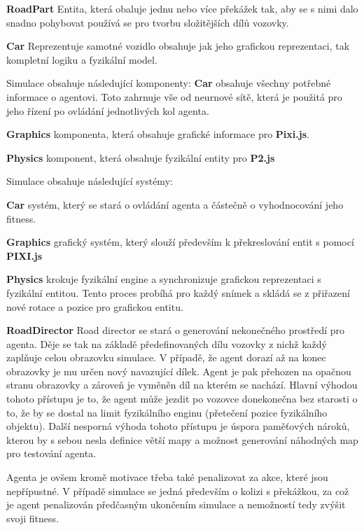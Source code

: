 \textbf{RoadPart} Entita, která obaluje jednu nebo více překážek tak, aby se s nimi dalo snadno pohybovat používá se pro tvorbu složitějších dílů vozovky.

\textbf{Car} Reprezentuje samotné vozidlo obsahuje jak jeho grafickou reprezentaci, tak kompletní logiku a fyzikální model.
 
Simulace obsahuje následující komponenty:
\textbf{Car} obsahuje všechny potřebné informace o agentovi. Toto zahrnuje vše od neurnové sítě, která je použitá pro jeho řízení po ovládání jednotlivých kol agenta.

\textbf{Graphics} komponenta, která obsahuje grafické informace pro \textbf{Pixi.js}.

\textbf{Physics} komponent, která obsahuje fyzikální entity pro \textbf{P2.js}

Simulace obsahuje následující systémy:

\textbf{Car} systém, který se stará o ovládání agenta a částečně o vyhodnocování jeho fitness.

\textbf{Graphics} grafický systém, který slouží především k překreslování entit s pomocí \textbf{PIXI.js}

\textbf{Physics} krokuje fyzikální engine a synchronizuje grafickou reprezentaci s fyzikální entitou. Tento proces probíhá pro každý snímek a skládá se z přiřazení nové rotace a pozice pro grafickou entitu.

\textbf{RoadDirector} Road director se stará o generování nekonečného prostředí pro agenta. Děje se tak na základě předefinovaných dílu vozovky z nichž každý zaplňuje celou obrazovku simulace. V případě, že agent dorazí až na konec obrazovky je mu určen nový navazující dílek. Agent je pak přehozen na opačnou stranu obrazovky a zároveň je vyměněn díl na kterém se nachází.
Hlavní výhodou tohoto přístupu je to, že agent může jezdit po vozovce donekonečna bez starosti o to, že by se dostal na limit fyzikálního enginu (přetečení pozice fyzikálního objektu). Další nesporná výhoda tohoto přístupu je úspora paměťových nároků, kterou by s sebou nesla definice větší mapy a možnost generování náhodných map pro testování agenta.

\label{sec:fitness}


Agenta je ovšem kromě motivace třeba také penalizovat za akce, které jsou nepřípustné. V případě simulace se jedná především o kolizi s překážkou, za což je agent penalizován předčasným ukončením simulace a nemožností tedy zvýšit svoji fitness.

